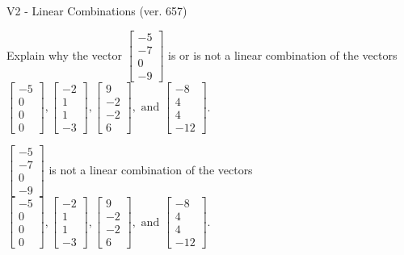 \begin{exercise}
  \begin{exerciseTitle}V2 - Linear Combinations (ver. 657)\end{exerciseTitle}
  \begin{exerciseStatement}
    Explain why the vector \(\left[\begin{array}{c}
-5 \\
-7 \\
0 \\
-9
\end{array}\right]\)  is or is not a linear 
	combination of the vectors \(\left[\begin{array}{c}
-5 \\
0 \\
0 \\
0
\end{array}\right] , \left[\begin{array}{c}
-2 \\
1 \\
1 \\
-3
\end{array}\right] , \left[\begin{array}{c}
9 \\
-2 \\
-2 \\
6
\end{array}\right] , \text{ and } \left[\begin{array}{c}
-8 \\
4 \\
4 \\
-12
\end{array}\right]\).
	


  \end{exerciseStatement}
  \begin{exerciseAnswer}
   \(\left[\begin{array}{c}
-5 \\
-7 \\
0 \\
-9
\end{array}\right]\) 
  	 is not  
	a linear combination of the vectors \(\left[\begin{array}{c}
-5 \\
0 \\
0 \\
0
\end{array}\right] , \left[\begin{array}{c}
-2 \\
1 \\
1 \\
-3
\end{array}\right] , \left[\begin{array}{c}
9 \\
-2 \\
-2 \\
6
\end{array}\right] , \text{ and } \left[\begin{array}{c}
-8 \\
4 \\
4 \\
-12
\end{array}\right]\).


\end{exerciseAnswer}
\end{exercise}
